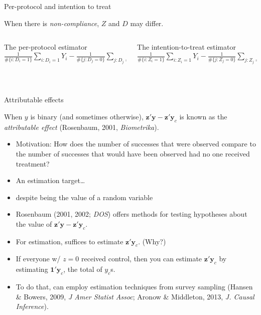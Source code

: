 \begin{frame}{Per-protocol and intention to treat}

When there is \textit{non-compliance}, $Z$ and $D$ may differ.  \pause  

  \begin{columns}
    \begin{Column}
  { The per-protocol estimator} \\      
$\frac{1}{\# \{i: D_i = 1\}} \sum_{i:D_i=1} Y_i - \frac{1}{\# \{j: D_j = 0\}} \sum_{j:D_j=0} Y_j$
\bigskip

\vspace{.5\textheight} 
\mbox{ }

    \end{Column}
    \begin{Column}
  { The intention-to-treat estimator} \\      
$\frac{1}{\# \{i: Z_i = 1\}} \sum_{i:Z_i=1} Y_i - \frac{1}{\# \{j: Z_j = 0\}} \sum_{j:Z_j=0} Y_j$
\bigskip


\vspace{.5\textheight} 
\mbox{ }
    \end{Column}

  \end{columns}
\end{frame}

\begin{frame}{Attributable effects}
  
When $y$ is binary (and sometimes otherwise), $\mathbf{z}'\mathbf{y} - \mathbf{z}'\mathbf{y}_{c}$ is known as the \textit{attributable effect} (Rosenbaum, 2001, \textit{Biometrika}).
\begin{itemize}
\item Motivation: How does the number of successes that were observed
  compare to the number of successes that would have been observed had
  no one received treatment?
\item An estimation target\ldots
\item despite being the value of a random variable
\item Rosenbaum (2001, 2002; \textit{DOS}) offers methods for testing hypotheses about the value of $\mathbf{z}'\mathbf{y} - \mathbf{z}'\mathbf{y}_{c}$.
\item<2-> For estimation, suffices to estimate $\mathbf{z}'\mathbf{y}_{c}$. (Why?)
\item<2-> If everyone w/ $z=0$ received control, then you can estimate  $\mathbf{z}'\mathbf{y}_{c}$ by estimating  $\mathbf{1}'\mathbf{y}_{c}$, the total of $y_{c}$s.
\item<2-> To do that, can employ estimation techniques from survey sampling (Hansen \& Bowers, 2009, \textit{J Amer Statist Assoc}; Aronow \& Middleton, 2013, \textit{J. Causal Inference}).
\end{itemize}


\end{frame}



